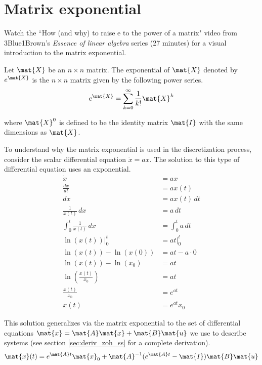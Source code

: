 \section{Matrix exponential}
\begin{remark}
  Watch the ``How (and why) to raise e to the power of a matrix" video from
  3Blue1Brown's \textit{Essence of linear algebra} series (27 minutes)
  \cite{bib:linalg_matrix_exp} for a visual introduction to the matrix
  exponential.
\end{remark}
\begin{definition}
  Let $\mat{X}$ be an $n \times n$ matrix. The exponential of $\mat{X}$ denoted
  by $e^{\mat{X}}$ is the $n \times n$ matrix given by the following power
  series.
  \begin{equation}
    e^{\mat{X}} = \sum_{k=0}^\infty \frac{1}{k!} \mat{X}^k \label{eq:mat_exp}
  \end{equation}

  where $\mat{X}^0$ is defined to be the identity matrix $\mat{I}$ with the same
  dimensions as $\mat{X}$.
\end{definition}

To understand why the matrix exponential is used in the \gls{discretization}
process, consider the scalar differential equation $\dot{x} = ax$. The solution
to this type of differential equation uses an exponential.
\begin{align*}
  \dot{x} &= ax \\
  \frac{dx}{dt} &= ax(t) \\
  dx &= ax(t) \,dt \\
  \frac{1}{x(t)} \,dx &= a \,dt \\
  \int_0^t \frac{1}{x(t)} \,dx &= \int_0^t a \,dt \\
  \ln(x(t)) \rvert_0^t &= at \rvert_0^t \\
  \ln(x(t)) - \ln(x(0)) &= at - a \cdot 0 \\
  \ln(x(t)) - \ln(x_0) &= at \\
  \ln\left(\frac{x(t)}{x_0}\right) &= at \\
  \frac{x(t)}{x_0} &= e^{at} \\
  x(t) &= e^{at} x_0
\end{align*}

This solution generalizes via the matrix exponential to the set of differential
equations $\dot{\mat{x}} = \mat{A}\mat{x} + \mat{B}\mat{u}$ we use to describe
\glspl{system} (see section \ref{sec:deriv_zoh_ss} for a complete derivation).
\begin{equation*}
  \mat{x}(t) = e^{\mat{A}t} \mat{x}_0 +
    \mat{A}^{-1}(e^{\mat{A}t} - \mat{I})\mat{B} \mat{u}
\end{equation*}

